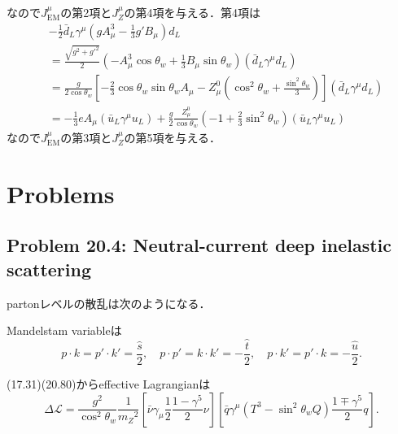なので$J_\text{EM}^\mu$の第2項と$J_Z^\mu$の第4項を与える．第4項は
\begin{align*}
  & - \frac{1}{2} \bar{d}_L \gamma^\mu \left(gA_\mu^3-\frac{1}{3}g'B_\mu\right) d_L \\
  &= \frac{\sqrt{g^2+g'^2}}{2} \left(-A_\mu^3\cos\theta_w+\frac{1}{3}B_\mu\sin\theta_w\right) (\bar{d}_L \gamma^\mu d_L) \\
  &= \frac{g}{2\cos\theta_w} \left[ -\frac{2}{3} \cos\theta_w\sin\theta_w A_\mu - Z_\mu^0 \left(\cos^2\theta_w+\frac{\sin^2\theta_w}{3}\right) \right] (\bar{d}_L \gamma^\mu d_L)\\
  &= -\frac{1}{3} e A_\mu (\bar{u}_L \gamma^\mu u_L)
  + \frac{g}{2} \frac{Z_\mu^0}{\cos\theta_w} \left(-1+\frac{2}{3}\sin^2\theta_w\right) (\bar{u}_L \gamma^\mu u_L)
\end{align*}
なので$J_\text{EM}^\mu$の第3項と$J_Z^\mu$の第5項を与える．

\section*{Problems}
\subsection{Problem 20.4: Neutral-current deep inelastic scattering}
partonレベルの散乱は次のようになる．

\begin{center}
\end{center}

Mandelstam variableは
\[
p\cdot k = p'\cdot k' = \frac{\hat{s}}{2} , \quad
p\cdot p' = k\cdot k' = - \frac{\hat{t}}{2} , \quad
p\cdot k' = p'\cdot k = - \frac{\hat{u}}{2} .
\]

(17.31)(20.80)からeffective Lagrangianは
\[
\varDelta\mathcal{L} = \frac{g^2}{\cos^2\theta_w} \frac{1}{m_Z{}^2}
\left[\bar\nu \gamma_\mu \frac{1}{2} \frac{1-\gamma^5}{2} \nu \right]
\left[\bar{q} \gamma^\mu (T^3-\sin^2\theta_wQ) \frac{1\mp\gamma^5}{2} q \right] .
\]

